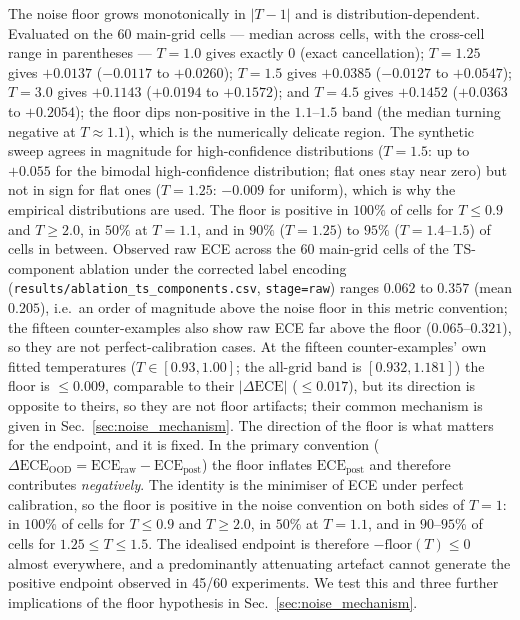 \documentclass[review,12pt,nonatbib]{elsarticle}
\begin{document}
The noise floor grows monotonically in $|T-1|$ and is
distribution-dependent. Evaluated on the 60 main-grid cells --- median
across cells, with the cross-cell range in parentheses --- $T=1.0$ gives
exactly $0$ (exact cancellation); $T=1.25$ gives $+0.0137$
($-0.0117$ to $+0.0260$); $T=1.5$ gives $+0.0385$ ($-0.0127$ to
$+0.0547$); $T=3.0$ gives $+0.1143$ ($+0.0194$ to $+0.1572$); and
$T=4.5$ gives $+0.1452$ ($+0.0363$ to $+0.2054$); the floor dips
non-positive in the $1.1$--$1.5$ band (the median turning negative at
$T\approx1.1$), which is the numerically delicate region. The synthetic
sweep
agrees in magnitude for high-confidence distributions ($T=1.5$: up to $+0.055$ for the bimodal high-confidence
distribution; flat ones stay near zero) but not in sign for flat ones
($T=1.25$: $-0.009$ for uniform), which is why the empirical
distributions are used. The floor is positive in $100\%$ of cells for
$T \leq 0.9$ and $T \geq 2.0$, in $50\%$ at $T=1.1$, and in $90\%$
($T=1.25$) to $95\%$ ($T=1.4$--$1.5$) of
cells in
between. Observed raw ECE across the 60 main-grid cells of the
TS-component ablation under the corrected label encoding
(\texttt{results/ablation\_ts\_components.csv},
\texttt{stage=raw}) ranges $0.062$ to $0.357$ (mean $0.205$), i.e.\
an order of magnitude above the noise floor in this metric convention;
the fifteen counter-examples
also show raw ECE far above the floor ($0.065$--$0.321$), so they are
not perfect-calibration cases. At the fifteen counter-examples' own
fitted temperatures ($T \in [0.93, 1.00]$; the all-grid band is
$[0.932, 1.181]$) the floor is $\leq 0.009$,
comparable to their $|\Delta\text{ECE}|$ ($\leq 0.017$), but its
direction is opposite to theirs, so they are not floor artifacts; their
common mechanism is given in Sec.~\ref{sec:noise_mechanism}.
%
%
The direction of the floor is what matters for the endpoint, and it is
fixed. In the primary convention ($\Delta\text{ECE}_{\text{OOD}} =
\text{ECE}_{\text{raw}} - \text{ECE}_{\text{post}}$) the floor inflates
$\text{ECE}_{\text{post}}$ and therefore contributes \emph{negatively}.
The identity is the minimiser of ECE under perfect calibration, so the
floor is positive in the noise convention on both sides of $T=1$: in
$100\%$ of cells for $T \leq 0.9$ and $T \geq 2.0$, in $50\%$ at
$T=1.1$, and in $90$--$95\%$
of cells for $1.25 \leq T \leq 1.5$. The idealised endpoint is therefore
$-\text{floor}(T) \leq 0$ almost everywhere, and a predominantly
attenuating artefact cannot generate the positive endpoint observed in
45/60 experiments. We test this and three further implications of the
floor hypothesis in Sec.~\ref{sec:noise_mechanism}.
\end{document}

